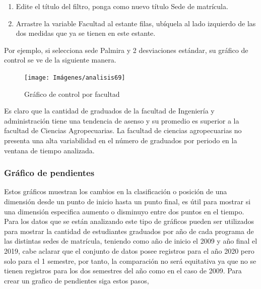 \documentclass[
]{book}
\begin{document}
\begin{enumerate}
\def\labelenumi{\arabic{enumi}.}
\setcounter{enumi}{4}
\item
  Edite el título del filtro, ponga como nuevo título Sede de matrícula.
\item
  Arrastre la variable Facultad al estante filas, ubíquela al lado izquierdo de las dos medidas que ya se tienen en este estante.
\end{enumerate}

Por ejemplo, si selecciona sede Palmira y 2 desviaciones estándar, su gráfico de control se ve de la siguiente manera.

\begin{figure}

{\centering \texttt{[image: Imágenes/analisis69]} 

}

\caption{Gráfico de control por facultad}\label{fig:controlfacultad-fig}
\end{figure}

Es claro que la cantidad de graduados de la facultad de Ingeniería y administración tiene una tendencia de asenso y su promedio es superior a la facultad de Ciencias Agropecuarias. La facultad de ciencias agropecuarias no presenta una alta variabilidad en el número de graduados por periodo en la ventana de tiempo analizada.

\hypertarget{graficopendientes}{%
\subsubsection{Gráfico de pendientes}\label{graficopendientes}}

Estos gráficos muestran los cambios en la clasificación o posición de una dimensión desde un punto de inicio hasta un punto final, es útil para mostrar si una dimensión especifica aumento o disminuyo entre dos puntos en el tiempo.
Para los datos que se están analizando este tipo de gráficos pueden ser utilizados para mostrar la cantidad de estudiantes graduados por año de cada programa de las distintas sedes de matrícula, teniendo como año de inicio el 2009 y año final el 2019, cabe aclarar que el conjunto de datos posee registros para el año 2020 pero solo para el 1 semestre, por tanto, la comparación no será equitativa ya que no se tienen registros para los dos semestres del año como en el caso de 2009. Para crear un grafico de pendientes siga estos pasos,
\end{document}

